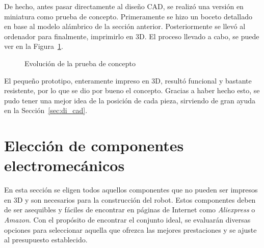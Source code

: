 \newpage
De hecho, antes pasar directamente al diseño \acs{CAD}, se realizó una versión en miniatura como prueba de concepto. 
Primeramente se hizo un boceto detallado en base al modelo alámbrico de la sección anterior. Posteriormente se llevó al 
ordenador para finalmente, imprimirlo en 3D. El proceso llevado a cabo, se puede ver en la \mbox{Figura \ref{fig:prueba_concepto}}.
\begin{figure} [h!]
  \centering    
  \hspace{2.5cm}
  \hspace{1cm}
  \caption[Prueba de concepto]{Evolución de la prueba de concepto}
  \label{fig:prueba_concepto}
\end{figure}

El pequeño prototipo, enteramente impreso en 3D, resultó funcional y bastante resistente, por lo que se dio por bueno el 
concepto. Gracias a haber hecho esto, se pudo tener una mejor idea de la posición de cada pieza, sirviendo de gran ayuda en 
la \mbox{Sección \ref{sec:di_cad}}.
\newpage
\section{Elección de componentes electromecánicos}
\noindent En esta sección se eligen todos aquellos componentes que no pueden ser impresos en 3D y son necesarios para 
la construcción del robot. Estos componentes deben de ser asequibles y fáciles de encontrar en páginas de Internet como 
\textit{Aliexpress} o \textit{Amazon}. Con el propósito de encontrar el conjunto ideal, se 
evaluarán diversas opciones para seleccionar aquella que ofrezca las mejores prestaciones y se ajuste al presupuesto establecido.

